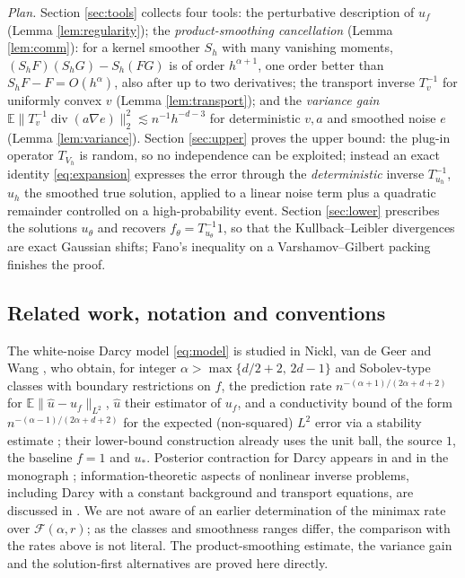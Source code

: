 \documentclass[12pt]{article}
\numberwithin{equation}{section}
\newcommand{\E}{\mathbb E}
\newcommand{\diver}{\operatorname{div}}
\begin{document}
\emph{Plan.} Section \ref{sec:tools} collects four tools: the
perturbative description of $u_f$ (Lemma \ref{lem:regularity}); the
\emph{product-smoothing cancellation} (Lemma \ref{lem:comm}): for a
kernel smoother $S_h$ with many vanishing moments,
$(S_hF)(S_hG)-S_h(FG)$ is of order $h^{\alpha+1}$, one order better
than $S_hF-F=O(h^\alpha)$, also after up to two derivatives; the
transport inverse $T_v^{-1}$ for uniformly convex $v$ (Lemma
\ref{lem:transport}); and the \emph{variance gain}
$\E\|T_v^{-1}\diver(a\nabla e)\|_2^2\lesssim n^{-1}h^{-d-3}$ for
deterministic $v,a$ and smoothed noise $e$ (Lemma \ref{lem:variance}).
Section \ref{sec:upper} proves the upper bound: the plug-in operator
$T_{V_h}$ is random, so no independence can be exploited; instead an
exact identity \eqref{eq:expansion} expresses the error through the
\emph{deterministic} inverse $T_{u_h}^{-1}$, $u_h$ the smoothed true
solution, applied to a linear noise term plus a quadratic remainder
controlled on a high-probability event. Section \ref{sec:lower}
prescribes the solutions $u_\theta$ and recovers
$f_\theta=T_{u_\theta}^{-1}1$, so that the Kullback--Leibler
divergences are exact Gaussian shifts; Fano's inequality on a
Varshamov--Gilbert packing finishes the proof.

\subsection{Related work, notation and conventions}\label{sec:notation}

The white-noise Darcy model \eqref{eq:model} is studied in Nickl, van
de Geer and Wang \cite{NvdGW}, who obtain, for integer
$\alpha>\max\{d/2+2,\,2d-1\}$ and Sobolev-type classes with boundary
restrictions on $f$, the prediction rate
$n^{-(\alpha+1)/(2\alpha+d+2)}$ for $\E\|\widehat u-u_f\|_{L^2}$,
$\widehat u$ their estimator of $u_f$, and a conductivity bound of the form $n^{-(\alpha-1)/(2\alpha+d+2)}$ for the
expected (non-squared) $L^2$ error via a stability estimate
\cite[Theorems 9--11]{NvdGW}; their lower-bound construction already
uses the unit ball, the source $1$, the baseline $f=1$ and $u_*$.
Posterior contraction for Darcy appears in \cite{GiNi} and in the
monograph \cite{Nickl23}; information-theoretic aspects of nonlinear
inverse problems, including Darcy with a constant background and
transport equations, are discussed in \cite{NP}. We are not aware of
an earlier determination of the minimax rate over
$\mathcal F(\alpha,r)$; as the classes and smoothness ranges differ,
the comparison with the rates above is not literal.
The product-smoothing estimate, the variance gain and the
solution-first alternatives are proved here directly.
\end{document}
